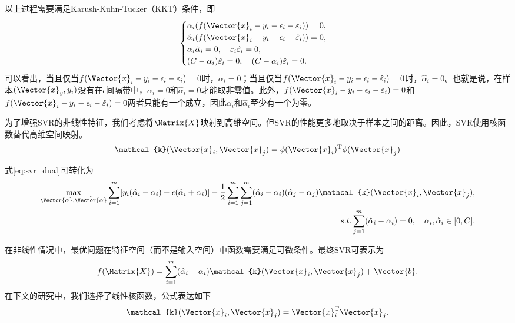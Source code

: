 以上过程需要满足Karush-Kuhn-Tucker（KKT）条件，即
\begin{equation}
  \label{eq:svr_kkt}
  \begin{cases}
    \alpha_i(f(\Vector{x}_i-y_i-\epsilon_i-\varepsilon_i))=0,\\
    \hat{\alpha}_i(f(\Vector{x}_i-y_i-\epsilon_i-\hat{\varepsilon}_i))=0,\\
    \alpha_i\hat{\alpha}_i=0,\quad  \varepsilon_i\hat{\varepsilon}_i=0,\\
    (C-\alpha_i)\hat{\varepsilon}_i=0,\quad  (C-\alpha_i)\hat{\varepsilon}_i=0.
  \end{cases}
\end{equation}
可以看出，当且仅当$f(\Vector{x}_i-y_i-\epsilon_i-\varepsilon_i)=0$时，$\alpha_i=0$；当且仅当$f(\Vector{x}_i-y_i-\epsilon_i-\hat{\varepsilon}_i)=0$时，$\hat{\alpha}_i=0$。也就是说，在样本$(\Vector{x}_y,y_i)$没有在$\epsilon$间隔带中，$\alpha_i=0$和$\hat{\alpha}_i=0$才能取非零值。此外，$f(\Vector{x}_i-y_i-\epsilon_i-\varepsilon_i)=0$和$f(\Vector{x}_i-y_i-\epsilon_i-\hat{\varepsilon}_i)=0$两者只能有一个成立，因此$\alpha_i$和$\hat{\alpha}_i$至少有一个为零。

为了增强SVR的非线性特征，我们考虑将$\Matrix{X}$映射到高维空间。但SVR的性能更多地取决于样本之间的距离。因此，SVR使用核函数替代高维空间映射。
\begin{equation}
  \label{eq:svr_kernel}
   \mathcal{k}(\Vector{x}_i,\Vector{x}_j)=\phi(\Vector{x}_i)^{\text{T}}\phi(\Vector{x}_j)
\end{equation}

式\ref{eq:svr_dual}可转化为
\begin{equation}
  \label{eq:svr_dual_kernel}
  \begin{split}
  \max\limits_{\Vector{\alpha},\hat{\Vector{\alpha}}}\sum_{i=1}^{m}[y_i(\hat{\alpha}_i-\alpha_i)-\epsilon(\hat{\alpha}_i+\alpha_i)]-\frac{1}{2}\sum_{i=1}^{m}\sum_{j=1}^{m}(\hat{\alpha}_i-\alpha_i)(\hat{\alpha}_j-\alpha_j)\mathcal{k}(\Vector{x}_i,\Vector{x}_j),\\
  s.t. 
  \sum_{j=1}^{m}(\hat{\alpha}_i-\alpha_i)=0, \quad \alpha_i, \hat{\alpha}_i\in[0,C].
  \end{split}
\end{equation}

在非线性情况中，最优问题在特征空间（而不是输入空间）中函数需要满足可微条件。最终SVR可表示为
\begin{equation}
  \label{eq:svr_kernel_v2}
  f(\Matrix{X})=\sum_{i=1}^{m}(\hat{\alpha}_i-\alpha_i)\mathcal{k}(\Vector{x}_i,\Vector{x}_j)+\Vector{b}.
\end{equation}
在下文的研究中，我们选择了线性核函数，公式表达如下
\begin{equation}
  \label{eq:svr_kernel_linear}
  \mathcal{k}(\Vector{x}_i,\Vector{x}_j)=\Vector{x}_i^{\text{T}}\Vector{x}_j.
\end{equation}


